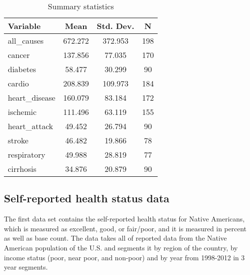 \documentclass[12pt]{article}
\begin{document}
\begin{table}[htbp]\centering \caption{Summary statistics \label{sumstat}}
\begin{tabular}{ | l || c | c | c |}\hline\hline
\textbf{Variable} & \textbf{Mean} & \textbf{Std. Dev.} & \textbf{N} \\\hline
all\_causes & 672.272 & 372.953  & 198\\\hline
cancer & 137.856 & 77.035  & 170\\\hline
diabetes & 58.477 & 30.299  & 90\\\hline
cardio & 208.839 & 109.973  & 184\\\hline
heart\_disease & 160.079 & 83.184  & 172\\\hline
ischemic & 111.496 & 63.119  & 155\\\hline
heart\_attack & 49.452 & 26.794  & 90\\\hline
stroke & 46.482 & 19.866  & 78\\\hline
respiratory & 49.988 & 28.819  & 77\\\hline
cirrhosis & 34.876 & 20.879  & 90\\
\hline
\end{tabular}
\end{table}


\subsection{Self-reported health status data}
The first data set contains the self-reported health status for Native Americans, which is measured as excellent, good, or fair/poor, and it is measured in percent as well as base count.
The data takes all of reported data from the Native American population of the U.S. and segments it by region of the country, by income status (poor, near poor, and non-poor) and by year from 1998-2012 in 3 year segments.
\end{document}
